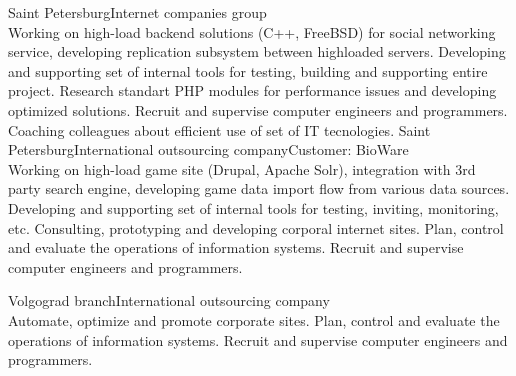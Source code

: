\documentclass[10pt,a4paper]{moderncv}
\begin{document}
    {Saint Petersburg}{Internet companies group}{\\
      Working on high-load backend solutions (C++, FreeBSD) for social networking service, developing replication subsystem between highloaded servers.
      Developing and supporting set of internal tools for testing, building and supporting entire project.
      Research standart PHP modules for performance issues and developing optimized solutions.
      Recruit and supervise computer engineers and programmers. Coaching colleagues about efficient use of set of IT tecnologies.
    \newline{}
    }
    {Saint Petersburg}{International outsourcing company}{Customer: BioWare\\
      Working on high-load game site (Drupal, Apache Solr), integration with 3rd party search engine, developing game data import flow from various data sources.
      Developing and supporting set of internal tools for testing, inviting, monitoring, etc. 
      Consulting, prototyping and developing corporal internet sites. 
      Plan, control and evaluate the operations of information systems. 
      Recruit and supervise computer engineers and programmers. 
    \newline{}
    }
    
    {Volgograd branch}{International outsourcing company}{\\
      Automate, optimize and promote corporate sites.
      Plan, control and evaluate the operations of information systems. 
      Recruit and supervise computer engineers and programmers. 
    \newline{}
    }
    
\end{document}
